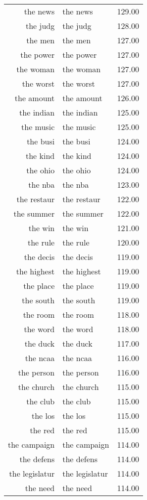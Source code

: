 \begin{table}[ht]
\begin{tabular}{rlr}
  the news & the news & 129.00 \\ 
  the judg & the judg & 128.00 \\ 
  the men & the men & 127.00 \\ 
  the power & the power & 127.00 \\ 
  the woman & the woman & 127.00 \\ 
  the worst & the worst & 127.00 \\ 
  the amount & the amount & 126.00 \\ 
  the indian & the indian & 125.00 \\ 
  the music & the music & 125.00 \\ 
  the busi & the busi & 124.00 \\ 
  the kind & the kind & 124.00 \\ 
  the ohio & the ohio & 124.00 \\ 
  the nba & the nba & 123.00 \\ 
  the restaur & the restaur & 122.00 \\ 
  the summer & the summer & 122.00 \\ 
  the win & the win & 121.00 \\ 
  the rule & the rule & 120.00 \\ 
  the decis & the decis & 119.00 \\ 
  the highest & the highest & 119.00 \\ 
  the place & the place & 119.00 \\ 
  the south & the south & 119.00 \\ 
  the room & the room & 118.00 \\ 
  the word & the word & 118.00 \\ 
  the duck & the duck & 117.00 \\ 
  the ncaa & the ncaa & 116.00 \\ 
  the person & the person & 116.00 \\ 
  the church & the church & 115.00 \\ 
  the club & the club & 115.00 \\ 
  the los & the los & 115.00 \\ 
  the red & the red & 115.00 \\ 
  the campaign & the campaign & 114.00 \\ 
  the defens & the defens & 114.00 \\ 
  the legislatur & the legislatur & 114.00 \\ 
  the need & the need & 114.00 \\ 

\end{tabular}
\end{table}
